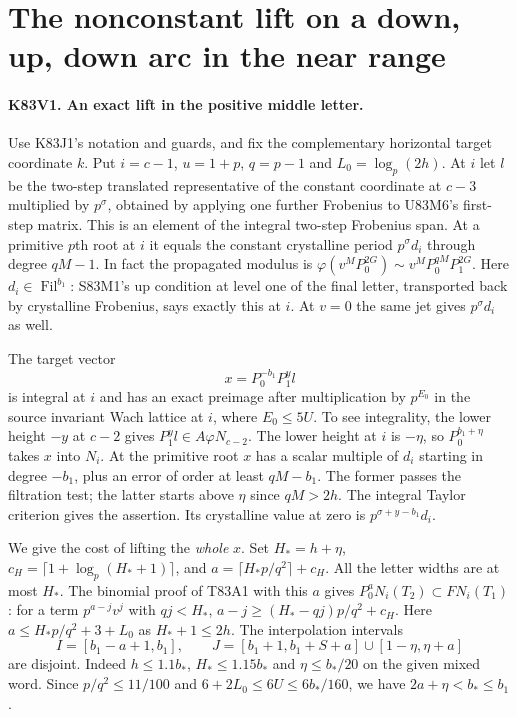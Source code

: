\section{The nonconstant lift on a down, up, down arc in the near range}

\paragraph{K83V1. An exact lift in the positive middle letter.}
Use K83J1's notation and guards, and fix the complementary
horizontal target coordinate $k$. Put $i=c-1$, $u=1+p$,
$q=p-1$ and $L_0=\log_p(2h)$. At $i$ let $l$ be the
two-step translated representative of the constant coordinate at
$c-3$ multiplied by $p^\sigma$, obtained by applying one further
Frobenius to U83M6's first-step matrix. This is an element of the
integral two-step Frobenius span. At a primitive $p$th root at $i$
it equals the constant crystalline period $p^\sigma d_i$ through
degree $qM-1$. In fact the propagated modulus is
$\varphi(v^M P_0^{2G})\sim v^M P_0^{qM}P_1^{2G}$.
Here $d_i\in\operatorname{Fil}^{b_1}$: S83M1's up condition
at level one of the final letter, transported back by crystalline
Frobenius, says exactly this at $i$. At $v=0$ the same jet gives
$p^\sigma d_i$ as well.

The target vector
\[
                 x=P_0^{-b_1}P_1^{y}l
\]
is integral at $i$ and has an exact preimage after multiplication
by $p^{E_0}$ in the source invariant Wach lattice at $i$, where
$E_0\le5U$. To see integrality, the lower height $-y$ at $c-2$
gives $P_1^yl\in A\varphi N_{c-2}$. The lower height at $i$
is $-\eta$, so $P_0^{b_1+\eta}$ takes $x$ into $N_i$.
At the primitive root $x$ has a scalar multiple of $d_i$ starting
in degree $-b_1$, plus an error of order at least $qM-b_1$.
The former passes the filtration test; the latter starts above
$\eta$ since $qM>2h$. The integral Taylor criterion gives the
assertion. Its crystalline value at zero is
$p^{\sigma+y-b_1}d_i$.

We give the cost of lifting the \emph{whole} $x$. Set
$H_*=h+\eta$, $c_H=\lceil1+\log_p(H_*+1)\rceil$, and
$a=\lceil H_*p/q^2\rceil+c_H$. All the letter widths are at
most $H_*$. The binomial proof of T83A1 with this $a$ gives
$P_0^a N_i(T_2)\subset F N_i(T_1)$:
for a term $p^{a-j}v^j$ with $qj<H_*$,
$a-j\ge (H_*-qj)p/q^2+c_H$. Here
$a\le H_*p/q^2+3+L_0$ as $H_*+1\le2h$.
The interpolation intervals
\[
 I=[b_1-a+1,b_1],\qquad
 J=[b_1+1,b_1+S+a]\cup[1-\eta,\eta+a]
\]
are disjoint. Indeed $h\le1.1 b_*$, $H_*\le1.15b_*$ and
$\eta\le b_*/20$ on the given mixed word.
Since $p/q^2\le11/100$ and $6+2L_0\le6U\le6b_*/160$,
we have $2a+\eta<b_*\le b_1$.

